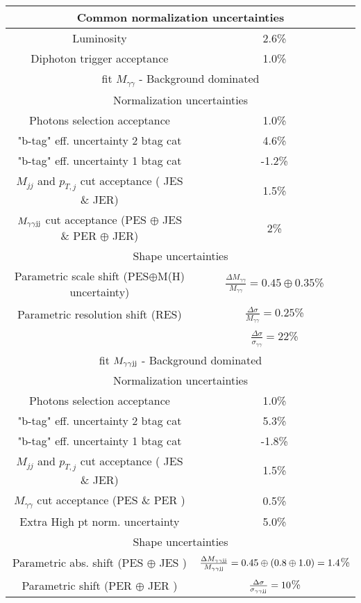 \begin{tabular}{|c|c|}
\hline
\multicolumn{2}{|c|}{Common normalization uncertainties} \\
\hline
Luminosity & 2.6\%\\
Diphoton trigger acceptance & 1.0\% \\
\hline
\hline
\multicolumn{2}{|c|}{fit $M_{\gamma\gamma}$ - Background dominated} \\
\hline
\hline
\multicolumn{2}{|c|}{Normalization uncertainties} \\
\hline
Photons selection acceptance & 1.0\% \\ 
"b-tag" eff. uncertainty 2 btag cat & 4.6\% \\  
"b-tag" eff. uncertainty 1 btag cat & -1.2\% \\  
$M_{jj}$ and $p_{T, j}$ cut acceptance ( JES \& JER) & 1.5\%\\
$M_{\gamma\gamma\rm jj}$ cut acceptance (PES $\oplus$ JES \& PER  $\oplus$ JER) & 2\%\\
\hline
\multicolumn{2}{|c|}{Shape uncertainties} \\
\hline
Parametric scale shift (PES$\oplus$M(H) uncertainty)      & $\frac{\Delta M_{\gamma \gamma}}{M_{\gamma \gamma}} = 0.45 \oplus 0.35$\%\\
Parametric resolution shift (RES) & $\frac{\Delta \sigma}{M_{\gamma \gamma}} = 0.25$\% \\
                                  & $\frac{\Delta \sigma}{\sigma_{\gamma \gamma}} = 22$\% \\
\hline
\hline
\multicolumn{2}{|c|}{fit $M_{\gamma\gamma\rm jj}$ - Background dominated} \\
\hline
\hline
\multicolumn{2}{|c|}{Normalization uncertainties} \\
\hline
Photons selection acceptance & 1.0\% \\ 
"b-tag" eff. uncertainty 2 btag cat & 5.3\% \\  
"b-tag" eff. uncertainty 1 btag cat & -1.8\% \\  
$M_{jj}$ and $p_{T, j}$ cut acceptance ( JES \& JER) & 1.5\%\\
$M_{\gamma\gamma}$ cut acceptance (PES \& PER ) & 0.5\% \\
Extra High pt norm. uncertainty & 5.0\% \\
\hline
\multicolumn{2}{|c|}{Shape uncertainties} \\
\hline
Parametric abs. shift (PES $\oplus$ JES ) & $\frac{\Delta M_{\gamma \gamma {\rm jj} }}{M_{\gamma \gamma {\rm jj} }} = 0.45 \oplus (0.8 \oplus 1.0) = 1.4$\% \\
Parametric shift (PER $\oplus$ JER ) & $\frac{\Delta \sigma}{\sigma_{\gamma \gamma {\rm jj} }} = 10$\% \\
\hline
\end{tabular}
